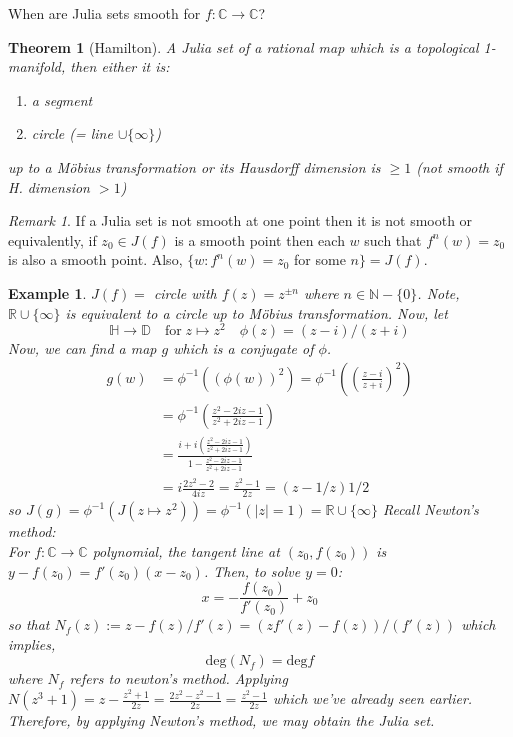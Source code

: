 \documentclass[a4paper, 11pt]{book}
\newtheorem{theorem}{Theorem}
\newtheorem*{example}{Example}
\theoremstyle{definition}
\theoremstyle{remark}
\newtheorem*{remark}{Remark}
\begin{document}
    When are Julia sets smooth for $f:\mathbb{C}\to\mathbb{C}$?

    \begin{theorem}[Hamilton]
        A Julia set of a rational map which is a topological 1-manifold, then either it is:
        \begin{enumerate}
            \item a segment
            \item circle (= line $\cup \{\infty\}$)
        \end{enumerate}
        up to a Möbius transformation or its Hausdorff dimension is $\geq 1$ (not smooth if H. dimension $>1$) 
    \end{theorem}

    \begin{remark}
        If a Julia set is not smooth at one point then it is not smooth or equivalently, if $z_0\in J(f)$ is a smooth point then each $w$
        such that $f^n(w)=z_0$ is also a smooth point. Also, $\{w:f^n(w)=z_0$ for some $n\} = J(f)$.
    \end{remark}

    \begin{example}
        $J(f) =$ circle with $f(z) = z^{\pm n}$ where $n\in\mathbb{N}-\{0\}$. Note, $\mathbb{R}\cup\{\infty\}$ is equivalent to a circle
        up to Möbius transformation. Now, let
        \[ \mathbb{H}\to \mathbb{D}\quad\text{for}\;z\mapsto z^2\quad \phi(z) = (z-i)/(z+i) \]
        Now, we can find a map $g$ which is a conjugate of $\phi$.
        \begin{align*}
            g(w) &= \phi^{-1}((\phi(w))^2) = \phi^{-1}((\frac{z-i}{z+i})^2) \\
                 &= \phi^{-1}(\frac{z^2-2iz-1}{z^2+2iz-1}) \\
                 &= \frac{i+i(\frac{z^2-2iz-1}{z^2+2iz-1})}{1-\frac{z^2-2iz-1}{z^2+2iz-1}} \\
                 &= i\frac{2z^2-2}{4iz} = \frac{z^2-1}{2z} = (z-1/z)1/2
        \end{align*}
        so $J(g) = \phi^{-1}(J(z\mapsto z^2)) = \phi^{-1}(|z|=1) = \mathbb{R}\cup\{\infty\}$ Recall Newton's method:\\
        For $f:\mathbb{C}\to\mathbb{C}$ polynomial, the tangent line at $(z_0,f(z_0))$ is $y-f(z_0)=f'(z_0)(x-z_0)$. Then, to solve $y=0$:
        \[  x = -\frac{f(z_0)}{f'(z_0)} + z_0 \]
        so that $N_f(z) := z-f(z)/f'(z) = (zf'(z)-f(z))/(f'(z))$ which implies,
        \[ \text{deg}(N_f) = \text{deg}f \]
        where $N_f$ refers to newton's method. Applying $N(z^3+1) = z-\frac{z^2+1}{2z} = \frac{2z^2-z^2-1}{2z} = \frac{z^2-1}{2z}$
        which we've already seen earlier. Therefore, by applying Newton's method, we may obtain the Julia set.
    \end{example}
\end{document}
